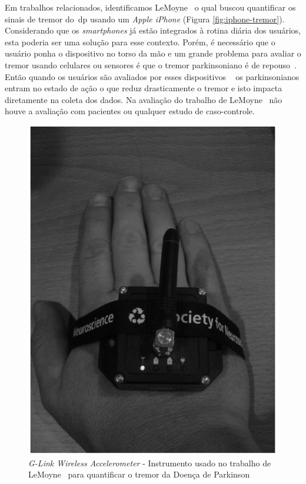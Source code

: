 Em trabalhos relacionados, identificamos LeMoyne~\cite{lemoyne2010} o qual buscou quantificar os sinais de tremor do~\ac{dp} usando um \textit{Apple iPhone} (Figura \ref{fig:iphone-tremor}). Considerando que os \textit{smartphones} já estão integrados à rotina diária dos usuários, esta poderia ser uma solução para esse contexto. Porém, é necessário que o usuário ponha o dispositivo no torso da mão e um grande problema para avaliar o tremor usando celulares ou sensores é que o tremor parkinsoniano é de repouso~\cite{jankovic2008}. Então quando os usuários são avaliados por esses dispositivos ~\cite{lemoyne2010,synnott_wiipd_2012} os parkinsonianos entram no estado de ação o que reduz drasticamente o tremor e isto impacta diretamente na coleta dos dados. Na avaliação do trabalho de LeMoyne~\cite{lemoyne2010} não houve a avaliação com pacientes ou qualquer estudo de caso-controle. %


\begin{figure}
 \centering
 \includegraphics[scale=0.3]{./img/quantif-parkinson.png}
\caption[\textit{G-Link Wireless Accelerometer} - Instrumento usado no trabalho de LeMoyne para quantificar o tremor da Doença de Parkinson]{\textit{G-Link Wireless Accelerometer} - Instrumento usado no trabalho de LeMoyne~\cite{LeMoyne2009} para quantificar o tremor da Doença de Parkinson} 
 \label{fig:quantif-parkinson}
\end{figure}


